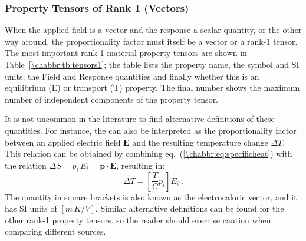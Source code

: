 \subsubsection{Property Tensors of Rank 1 (Vectors)}

When the applied field is a vector and the response a scalar quantity, or the other way around, the proportionality factor must itself be a vector or a rank-1 tensor. The most important rank-1 material property tensors are shown in Table~\ref{\chabbr:tb:tensors1}; the table lists the property name, the symbol and SI units, the Field and Response quantities and finally whether this is an equilibrium (E) or transport (T) property. The final number shows the maximum number of independent components of the property tensor.

It is not uncommon in the literature to find alternative definitions of these quantities. For instance, the  can also be interpreted as the proportionality factor between an applied electric field $\mathbf{E}$ and the resulting temperature change $\Delta T$. This relation can be obtained by combining eq.~(\ref{\chabbr:eq:specificheat}) with the relation $\Delta S=p_i\,E_i=\mathbf{p}\cdot\mathbf{E}$, resulting in:
\begin{equation}
	\Delta T = \left[\frac{T}{C}p_i\right]E_i\ .
\end{equation}
The quantity in square brackets is also known as the electrocaloric vector, and it has SI units of $[m\,K/V]$. Similar alternative definitions can be found for the other rank-1 property tensors, so the reader should exercise caution when comparing different sources.

